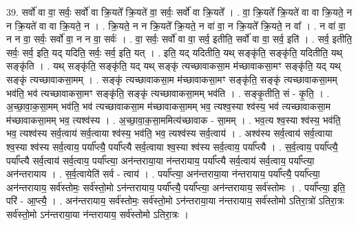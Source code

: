 \documentclass[17pt]{extarticle}
\begin{document}
39. सर्वो॑ वा वा॒ सर्वः॒ सर्वो॑ वा क्रि॒यते᳚ क्रि॒यते॑ वा॒ सर्वः॒ सर्वो॑ वा क्रि॒यते᳚ । . वा॒ क्रि॒यते᳚ क्रि॒यते॑ वा वा क्रि॒यते॒ न न क्रि॒यते॑ वा वा क्रि॒यते॒ न । . क्रि॒यते॒ न न क्रि॒यते᳚ क्रि॒यते॒ न वा॑ वा॒ न क्रि॒यते᳚ क्रि॒यते॒ न वा᳚ । . न वा॑ वा॒ न न वा॒ सर्वः॒ सर्वो॑ वा॒ न न वा॒ सर्वः॑ । . वा॒ सर्वः॒ सर्वो॑ वा वा॒ सर्व॒ इतीति॒ सर्वो॑ वा वा॒ सर्व॒ इति॑ । . सर्व॒ इतीति॒ सर्वः॒ सर्व॒ इति॒ यद् यदिति॒ सर्वः॒ सर्व॒ इति॒ यत् । . इति॒ यद् यदितीति॒ यथ् सङ्कृ॑ति॒ सङ्कृ॑ति॒ यदितीति॒ यथ् सङ्कृ॑ति । . यथ् सङ्कृ॑ति॒ सङ्कृ॑ति॒ यद् यथ् सङ्कृ॑ त्यच्छावाकसा॒म म॑च्छावाकसा॒मꣳ सङ्कृ॑ति॒ यद् यथ् सङ्कृ॑ त्यच्छावाकसा॒मम् । . सङ्कृ॑ त्यच्छावाकसा॒म म॑च्छावाकसा॒मꣳ सङ्कृ॑ति॒ सङ्कृ॑ त्यच्छावाकसा॒मम् भव॑ति॒ भव॑
त्यच्छावाकसा॒मꣳ सङ्कृ॑ति॒ सङ्कृ॑ त्यच्छावाकसा॒मम् भव॑ति । . सङ्कृ॒तीति॒ सं - कृ॒ति॒ । . अ॒च्छा॒वा॒क॒सा॒मम् भव॑ति॒ भव॑ त्यच्छावाकसा॒म म॑च्छावाकसा॒मम् भव॒ त्यश्व॒स्या श्व॑स्य॒ भव॑
त्यच्छावाकसा॒म म॑च्छावाकसा॒मम् भव॒ त्यश्व॑स्य । . अ॒च्छा॒वा॒क॒सा॒ममित्य॑च्छावाक - सा॒मम् । . भव॒त्य श्व॒स्या श्व॑स्य॒ भव॑ति॒ भव॒ त्यश्व॑स्य सर्व॒त्वाय॑ सर्व॒त्वाया श्व॑स्य॒ भव॑ति॒ भव॒
त्यश्व॑स्य सर्व॒त्वाय॑ । . अश्व॑स्य सर्व॒त्वाय॑ सर्व॒त्वाया श्व॒स्या श्व॑स्य सर्व॒त्वाय॒ पर्या᳚प्त्यै॒ पर्या᳚प्त्यै सर्व॒त्वाया श्व॒स्या श्व॑स्य सर्व॒त्वाय॒ पर्या᳚प्त्यै । . स॒र्व॒त्वाय॒ पर्या᳚प्त्यै॒ पर्या᳚प्त्यै सर्व॒त्वाय॑ सर्व॒त्वाय॒ पर्या᳚प्त्या॒ अन॑न्तराया॒या न॑न्तरायाय॒ पर्या᳚प्त्यै सर्व॒त्वाय॑ सर्व॒त्वाय॒ पर्या᳚प्त्या॒ अन॑न्तरायाय । . स॒र्व॒त्वायेति॑ सर्व - त्वाय॑ । . पर्या᳚प्त्या॒ अन॑न्तराया॒या न॑न्तरायाय॒ पर्या᳚प्त्यै॒ पर्या᳚प्त्या॒ अन॑न्तरायाय॒ सर्व॑स्तोमः॒ सर्व॑स्तो॒मो ऽन॑न्तरायाय॒ पर्या᳚प्त्यै॒ पर्या᳚प्त्या॒ अन॑न्तरायाय॒ सर्व॑स्तोमः । . पर्या᳚प्त्या॒ इति॒ परि॑ - आ॒प्त्यै॒ । . अन॑न्तरायाय॒ सर्व॑स्तोमः॒ सर्व॑स्तो॒मो ऽन॑न्तराया॒या न॑न्तरायाय॒ सर्व॑स्तोमो ऽतिरा॒त्रो॑ ऽतिरा॒त्रः सर्व॑स्तो॒मो ऽन॑न्तराया॒या न॑न्तरायाय॒ सर्व॑स्तोमो ऽतिरा॒त्रः । \newline
\end{document}
